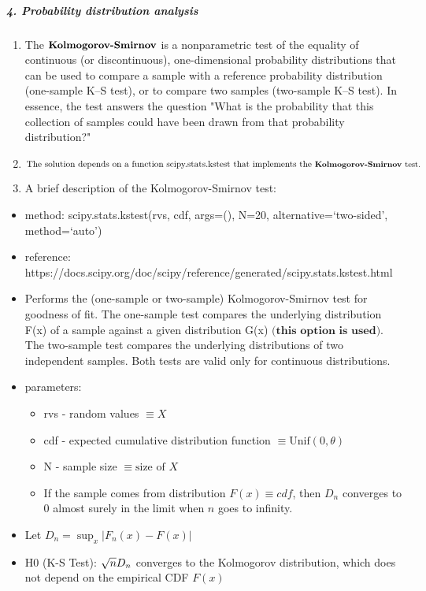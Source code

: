 \documentclass[11pt]{article}
\providecommand{\tightlist}{%
      \setlength{\itemsep}{0pt}\setlength{\parskip}{0pt}}
\begin{document}
    

    \hypertarget{introduction-probability-distribution-analysis}{%
\subparagraph{4. Probability distribution
analysis}\label{introduction-probability-distribution-analysis}}

\begin{enumerate}
\def\labelenumi{\arabic{enumi}.}
\tightlist
\item
  The \(\small{\textbf{Kolmogorov-Smirnov}}\) is a nonparametric test of the equality of continuous (or discontinuous), one-dimensional probability distributions that can be used to compare a sample with a reference probability distribution (one-sample K–S test), or to compare two samples (two-sample K–S test). In essence, the test answers the question "What is the probability that this collection of samples could have been drawn from that probability distribution?"
\item
  \(\text{The solution depends on a function scipy.stats.kstest that implements the}\small{\textbf{ Kolmogorov-Smirnov }}\text{test.}\)
\item
  A brief description of the Kolmogorov-Smirnov test:
\end{enumerate}

\begin{itemize}
\tightlist
\item
  method: scipy.stats.kstest(rvs, cdf, args=(), N=20,
  alternative=`two-sided', method=`auto')
\item
  reference:
  https://docs.scipy.org/doc/scipy/reference/generated/scipy.stats.kstest.html
\item
  Performs the (one-sample or two-sample) Kolmogorov-Smirnov test for
  goodness of fit. The one-sample test compares the underlying
  distribution F(x) of a sample against a given distribution G(x)
  \(\textbf{(this option is used)}\). The two-sample test compares the
  underlying distributions of two independent samples. Both tests are
  valid only for continuous distributions.
\item
  parameters:

  \begin{itemize}
  \tightlist
  \item
    rvs - random values \(\equiv X\)
  \item
    cdf - expected cumulative distribution function
    \(\equiv \text{Unif}(0,\theta)\)
  \item
    N - sample size \(\equiv \text{size of } X\)
  \item
    If the sample comes from distribution \(F(x) \equiv cdf\), then
    \(D_n\) converges to 0 almost surely in the limit when
    \({\displaystyle n}\) goes to infinity.
  \end{itemize}
  \item
  Let \(D_{n}=\sup _{x}|F_{n}(x)-F(x)|\)
  \item
  H0 (K-S Test): \({\sqrt {n}}D_{n} \space\space\) converges to the Kolmogorov
  distribution, which does not depend on the empirical CDF \(F(x)\)

\end{itemize}
\end{document}
